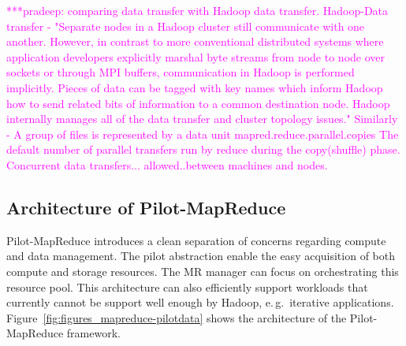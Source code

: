 \documentclass{acm_proc_article-sp}
\newcommand{\pnote}[1]{ {\textcolor{magenta} { ***pradeep: #1 }}}
\newcommand{\pnote}[1]{}
\newcommand{\pilotmapreduce}{Pilot-MapReduce\xspace}
\begin{document}
\pnote{
   comparing data transfer with Hadoop data transfer.
Hadoop-Data transfer - "Separate nodes in a Hadoop cluster still communicate with one another. However, in contrast to more conventional distributed systems where application developers explicitly marshal byte streams from node to node over sockets or through MPI buffers, communication in Hadoop is performed implicitly. Pieces of data can be tagged with key names which inform Hadoop how to send related bits of information to a common destination node. Hadoop internally manages all of the data transfer and cluster topology issues."
Similarly - A group of files is represented by a data unit
mapred.reduce.parallel.copies		The default number of parallel transfers run by reduce during the copy(shuffle) phase.
Concurrent data transfers... allowed..between machines and nodes.}



\subsection{Architecture of Pilot-MapReduce}



Pilot-MapReduce introduces a clean separation of concerns regarding compute and data management. The
pilot abstraction enable the easy acquisition of both compute and storage
resources. The MR manager can focus on orchestrating this resource pool. This architecture can also efficiently support workloads that currently cannot be support well enough by Hadoop, e.\,g.\ iterative applications. Figure~\ref{fig:figures_mapreduce-pilotdata} shows the architecture of the
\pilotmapreduce framework.
\end{document}

